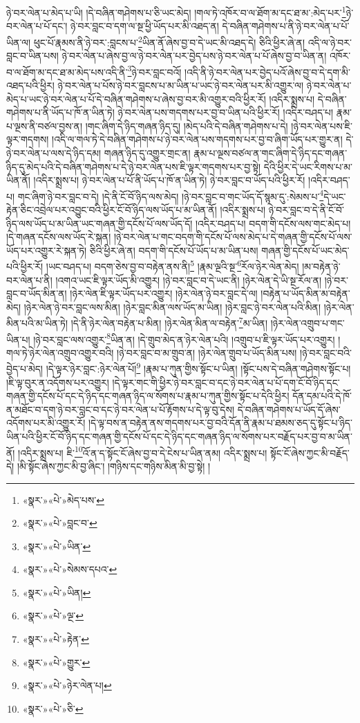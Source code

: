 ཉེ་བར་ལེན་པ་མེད་པ་ཡི། །དེ་བཞིན་གཤེགས་པ་ཅི་ཡང་མེད། །གལ་ཏེ་འཁོར་བ་ལ་ཐོག་མ་དང་ཐ་མ་:མེད་པར་\footnote{«སྣར་»«པེ་»མེད་པས་}ཉེ་བར་ལེན་པ་པོ་དང་། ཉེ་བར་བླང་བ་དག་ལ་སྔ་ཕྱི་ཡོད་པར་མི་འཐད་ན། དེ་བཞིན་གཤེགས་པ་ནི་ཉེ་བར་ལེན་པ་པོ་ཡིན་ལ། ཕུང་པོ་རྣམས་ནི་ཉེ་བར་:བླངས་པ་\footnote{«སྣར་»«པེ་»བླང་བ་}ཡིན་ནོ་ཞེས་བྱ་བ་དེ་ཡང་མི་འཐད་དེ། ཅིའི་ཕྱིར་ཞེ་ན། འདི་ལ་ཉེ་བར་བླང་བ་ཡིན་པས། ཉེ་བར་ལེན་པ་ཞེས་བྱ་ལ་ཉེ་བར་ལེན་པར་བྱེད་པས་ཉེ་བར་ལེན་པ་པོ་ཞེས་བྱ་བ་ཡིན་ན། འཁོར་བ་ལ་ཐོག་མ་དང་ཐ་མ་མེད་པས་འདི་ནི་\footnote{«སྣར་»«པེ་»ཡིན་}ཉེ་བར་བླང་བའོ། །འདི་ནི་ཉེ་བར་ལེན་པར་བྱེད་པའོ་ཞེས་བྱ་བ་དེ་དག་མི་འཐད་པའི་ཕྱིར། ཉེ་བར་ལེན་པ་པོས་ཉེ་བར་བླངས་པ་མ་ཡིན་པ་ཡང་ཉེ་བར་ལེན་པར་མི་འགྱུར་ལ། ཉེ་བར་ལེན་པ་མེད་པ་ཡང་ཉེ་བར་ལེན་པ་པོ་དེ་བཞིན་གཤེགས་པ་ཞེས་བྱ་བར་མི་འགྱུར་བའི་ཕྱིར་རོ། །འདིར་སྨྲས་པ། དེ་བཞིན་གཤེགས་པ་ནི་ཡོད་པ་ཁོ་ན་ཡིན་ཏེ། ཉེ་བར་ལེན་པས་གདགས་པར་བྱ་བ་ཡིན་པའི་ཕྱིར་རོ། །འདིར་བཤད་པ། རྣམ་པ་ལྔས་ནི་བཙལ་བྱས་ན། །གང་ཞིག་དེ་ཉིད་གཞན་ཉིད་དུ། །མེད་པའི་དེ་བཞིན་གཤེགས་པ་དེ། །ཉེ་བར་ལེན་པས་ཇི་ལྟར་གདགས། །འདི་ལ་གལ་ཏེ་དེ་བཞིན་གཤེགས་པ་ཉེ་བར་ལེན་པས་གདགས་པར་བྱ་བ་ཞིག་ཡོད་པར་གྱུར་ན། དེ་ཉེ་བར་ལེན་པ་ལས་དེ་ཉིད་དམ། གཞན་ཉིད་དུ་འགྱུར་གྲང་ན། རྣམ་པ་ལྔས་བཙལ་ན་གང་ཞིག་དེ་ཉིད་དང་གཞན་ཉིད་དུ་མེད་པའི་དེ་བཞིན་གཤེགས་པ་དེ་ཉེ་བར་ལེན་པས་ཇི་ལྟར་གདགས་པར་བྱ་སྟེ། དེའི་ཕྱིར་དེ་ཡང་རིགས་པ་མ་ཡིན་ནོ། །འདིར་སྨྲས་པ། ཉེ་བར་ལེན་པ་པོ་ནི་ཡོད་པ་ཁོ་ན་ཡིན་ཏེ། ཉེ་བར་བླང་བ་ཡོད་པའི་ཕྱིར་རོ། །འདིར་བཤད་པ། གང་ཞིག་ཉེ་བར་བླང་བ་དེ། །དེ་ནི་ངོ་བོ་ཉིད་ལས་མེད། །ཉེ་བར་བླང་བ་གང་ཡོད་དོ་སྙམ་དུ་:སེམས་པ་\footnote{«སྣར་»«པེ་»སེམས་དཔའ་}དེ་ཡང་རྟེན་ཅིང་འབྲེལ་པར་འབྱུང་བའི་ཕྱིར་ངོ་བོ་ཉིད་ལས་ཡོད་པ་མ་ཡིན་ནོ། །འདིར་སྨྲས་པ། ཉེ་བར་བླང་བ་དེ་ནི་ངོ་བོ་ཉིད་ལས་ཡོད་པ་མ་ཡིན་ཡང་གཞན་གྱི་དངོས་པོ་ལས་ཡོད་དོ། །འདིར་བཤད་པ། བདག་གི་དངོས་ལས་གང་མེད་པ། །དེ་གཞན་དངོས་ལས་ཡོད་རེ་སྐན། །ཉེ་བར་ལེན་པ་གང་བདག་གི་དངོས་པོ་ལས་མེད་པ་དེ་གཞན་གྱི་དངོས་པོ་ལས་ཡོད་པར་འགྱུར་རེ་སྐན་ཏེ། ཅིའི་ཕྱིར་ཞེ་ན། བདག་གི་དངོས་པོ་ཡོད་པ་མ་ཡིན་པས། གཞན་གྱི་དངོས་པོ་ཡང་མེད་པའི་ཕྱིར་རོ། །ཡང་བཤད་པ། བདག་ཅེས་བྱ་བ་བརྟེན་ནས་ནི།\footnote{«སྣར་»«པེ་»ཡིན།} །རྣམ་ལྔའི་སྔ་\footnote{«སྣར་»«པེ་»ལྔ་}རོལ་ཉེར་ལེན་མེད། །མ་བརྟེན་ཉེ་བར་ལེན་པ་ནི། །འགའ་ཡང་ཇི་ལྟར་ཡོད་མི་འགྱུར། །ཉེ་བར་བླང་བ་དེ་ཡང་ནི། །ཉེར་ལེན་དེ་ཡི་སྔ་རོལ་ན། །ཉེ་བར་བླང་བ་ཡོད་མིན་ན། །ཉེར་ལེན་ཇི་ལྟར་ཡོད་པར་འགྱུར། །ཉེར་ལེན་ཉེ་བར་བླང་དེ་ལ། །བརྟེན་པ་ཡོད་མིན་མ་བརྟེན་མེད། །ཉེར་ལེན་ཉེ་བར་བླང་ལས་མིན། །ཉེར་བླང་མིན་ལས་ཡོད་མ་ཡིན། །ཉེར་བླང་ཉེ་བར་ལེན་པའི་མིན། །ཉེར་ལེན་མིན་པའི་མ་ཡིན་ཏེ། །དེ་ནི་ཉེར་ལེན་བརྟེན་པ་མིན། །ཉེར་ལེན་མིན་ལ་བརྟེན་\footnote{«སྣར་»«པེ་»རྟེན་}མ་ཡིན། །ཉེར་ལེན་འགྲུབ་པ་གང་ཡིན་པ། །ཉེ་བར་བླང་ལས་འགྱུར་\footnote{«སྣར་»«པེ་»གྱུར་}ཡིན་ན། །དེ་གྲུབ་མེད་ན་ཉེར་ལེན་པའི། །འགྲུབ་པ་ཇི་ལྟར་ཡོད་པར་འགྱུར། །གལ་ཏེ་ཉེར་ལེན་འགྲུབ་འགྱུར་བའི། །ཉེ་བར་བླང་བ་མ་གྲུབ་ན། །ཉེར་ལེན་གྲུབ་པ་ཡོད་མིན་པས། །ཉེ་བར་བླང་བའི་བྱེད་པ་མེད། །དེ་ལྟར་ཉེར་བླང་:ཉེར་ལེན་པོ།\footnote{«སྣར་»«པེ་»ཉེར་ལེན་པ།} །རྣམ་པ་ཀུན་གྱིས་སྟོང་པ་ཡིན། །སྟོང་པས་དེ་བཞིན་གཤེགས་སྟོང་པ། །ཇི་ལྟ་བུར་ན་འདོགས་པར་འགྱུར། །དེ་ལྟར་གང་གི་ཕྱིར་ཉེ་བར་བླང་བ་དང་ཉེ་བར་ལེན་པ་པོ་དག་ངོ་བོ་ཉིད་དང་གཞན་གྱི་དངོས་པོ་དང་དེ་ཉིད་དང་གཞན་ཉིད་ལ་སོགས་པ་རྣམ་པ་ཀུན་གྱིས་སྟོང་པ་དེའི་ཕྱིར། དོན་དམ་པའི་དེ་ཁོ་ན་མཐོང་བ་དག་ཉེ་བར་བླང་བ་དང་ཉེ་བར་ལེན་པ་པོ་རྟོགས་པ་དེ་ལྟ་བུ་དེས། དེ་བཞིན་གཤེགས་པ་ཡོད་དོ་ཞེས་འདོགས་པར་མི་འགྱུར་རོ། །དེ་ལྟ་བས་ན་བརྟེན་ནས་གདགས་པར་བྱ་བའི་དོན་ནི་རྣམ་པ་ཐམས་ཅད་དུ་སྟོང་པ་ཉིད་ཡིན་པའི་ཕྱིར་ངོ་བོ་ཉིད་དང་གཞན་གྱི་དངོས་པོ་དང་དེ་ཉིད་དང་གཞན་ཉིད་ལ་སོགས་པར་བརྗོད་པར་བྱ་བ་མ་ཡིན་ནོ། །འདིར་སྨྲས་པ། ཇི་\footnote{«སྣར་»«པེ་»ཅི་}འོ་ན་ད་སྟོང་ངོ་ཞེས་བྱ་བ་དེ་ངེས་པ་ཡིན་ནམ། འདིར་སྨྲས་པ། སྟོང་ངོ་ཞེས་ཀྱང་མི་བརྗོད་དེ། །མི་སྟོང་ཞེས་ཀྱང་མི་བྱ་ཞིང་། །གཉིས་དང་གཉིས་མིན་མི་བྱ་སྟེ། །
